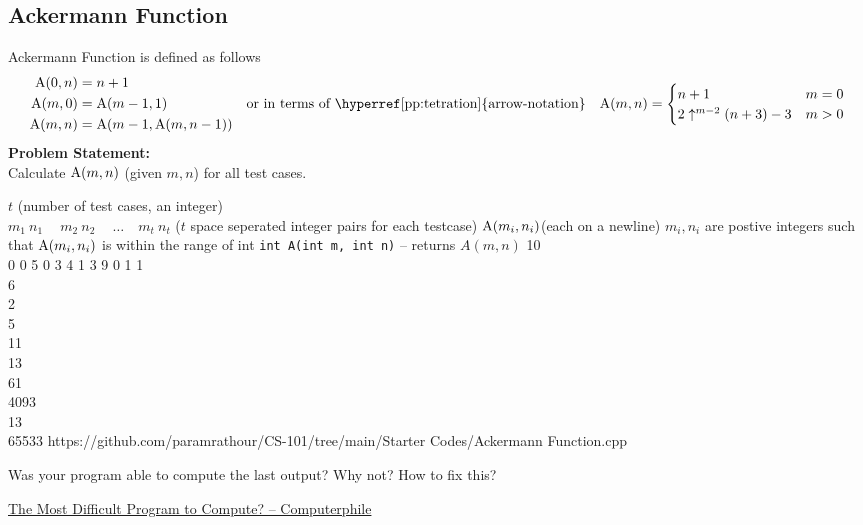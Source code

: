 \documentclass[../../Problems]{subfiles}
\begin{document}
\subsection{Ackermann Function}
Ackermann Function is defined as follows
\begin{equation}
	\begin{aligned}
		\op{A}(0,n)&=n+1\\
		\op{A}(m,0)&=\op{A}(m-1,1)\\
		\op{A}(m,n)&=\op{A}(m-1,\op{A}(m,n-1))
	\end{aligned} \quad\text{or in terms of \hyperref[pp:tetration]{arrow-notation}}\quad
		\begin{aligned}
		\op{A}(m,n) =
			\begin{cases}n+1&m=0\\
			2\uparrow ^{m-2}(n+3)-3&m>0
			\end{cases}
	\end{aligned}
\end{equation}
\textbf{Problem Statement:}\\
Calculate $\operatorname{A}(m,n)$ (given $m,n$) for all test cases.
\begin{testcasesFunction}
	{$t$ \hfill(number of test cases, an integer)\\
	$m_1\ n_1\ \quad m_2\ n_2\ \quad \ldots\quad m_t\ n_t$ \hfill($t$ space seperated integer pairs for each testcase)}
	{$\operatorname{A}(m_i,n_i)$\hfill(each on a newline)}
	{$m_i,n_i$ are postive integers such that $\operatorname{A}(m_i,n_i)$ is within the range of int}
	{\texttt{int A(int m, int n)} -- returns $A(m,n)$}
	{10\\0 0 5 0 3 4 1 3 9 0 1}
	{1\\6\\2\\5\\11\\13\\61\\4093\\13\\65533}
	{https://github.com/paramrathour/CS-101/tree/main/Starter Codes/Ackermann Function.cpp}
\end{testcasesFunction}
\begin{noteI}
	Was your program able to compute the last output? Why not? How to fix this?
\end{noteI}
\begin{funvideo}
\href{https://youtu.be/i7sm9dzFtEI}{The Most Difficult Program to Compute? -- Computerphile}
\end{funvideo}
\end{document}
